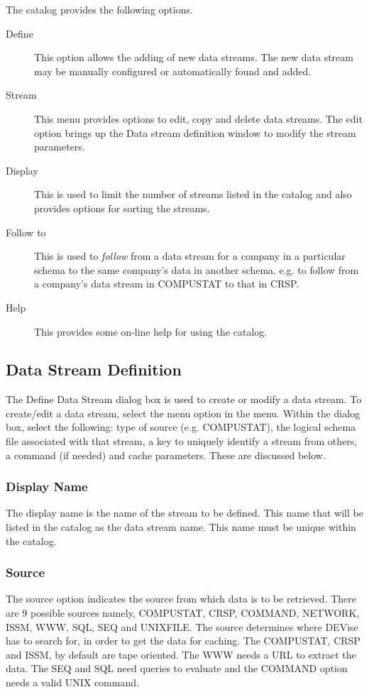 The catalog provides the following options.
\begin{description}
\item[Define] This option allows the adding of new data streams. The
new data stream may be manually configured or automatically found and
added.
\item[Stream] This menu provides options to edit, copy and delete data
streams. The edit option brings up the Data stream definition window
to modify the stream parameters.
\item[Display] This is used to limit the number of streams listed in
the catalog and also provides options for sorting the streams.
\item[Follow to] This is used to {\em follow} from a data stream for
a company in a particular schema to the same company's data in another
schema. e.g. to follow from a company's data stream in COMPUSTAT to
that in CRSP.
\item[Help] This provides some on-line help for using the catalog.
\end{description}

\subsection{Data Stream Definition}

The Define Data Stream dialog box is used to create or modify a data stream. To
create/edit a data stream, select the  menu option in the
 menu. Within the dialog box, select the following: type of source
(e.g. COMPUSTAT), the logical schema file associated with that stream, a key to
uniquely identify a stream from others, a command (if needed) and cache
parameters. These are discussed below.

\subsubsection{Display Name}

The display name is the name of the stream to be defined. This name that will be
listed in the catalog as the data stream name. This name must be unique within
the catalog.

\subsubsection{Source}

The source option indicates the source from which data is to be retrieved. There
are 9 possible sources namely, COMPUSTAT, CRSP, COMMAND, NETWORK, ISSM, WWW,
SQL, SEQ and UNIXFILE. The source determines where DEVise has to search for, in
order to get the data for caching. The COMPUSTAT, CRSP and ISSM, by default are
tape oriented. The WWW needs a URL to extract the data. The SEQ and SQL need
queries to evaluate and the COMMAND option needs a valid UNIX command.

